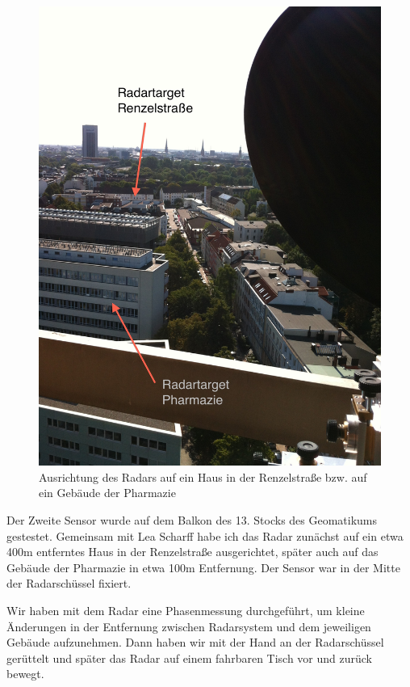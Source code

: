 \documentclass[12pt,a4paper]{scrartcl}
\begin{document}
\begin{figure}[htb]
\centering
\includegraphics[scale=.13]{targets.jpg}
\caption{Ausrichtung des Radars auf ein Haus in der Renzelstraße bzw. auf ein Gebäude der Pharmazie}
\label{targets}
\end{figure}


Der Zweite Sensor wurde auf dem Balkon des 13. Stocks des Geomatikums gestestet. Gemeinsam mit Lea Scharff habe ich das Radar zunächst auf ein etwa 400m entferntes Haus in der Renzelstraße ausgerichtet, später auch auf das Gebäude der Pharmazie in etwa 100m Entfernung. Der Sensor war in der Mitte der Radarschüssel fixiert. 

Wir haben mit dem Radar eine Phasenmessung durchgeführt, um kleine Änderungen in der Entfernung zwischen Radarsystem und dem jeweiligen Gebäude aufzunehmen. Dann haben wir mit der Hand an der Radarschüssel gerüttelt und später das Radar auf einem fahrbaren Tisch vor und zurück bewegt.
\end{document}
